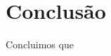 \documentclass[por]{Template_SBEF}
\begin{document}
 
\section{Conclusão}
Concluimos que 




%



\end{document}
